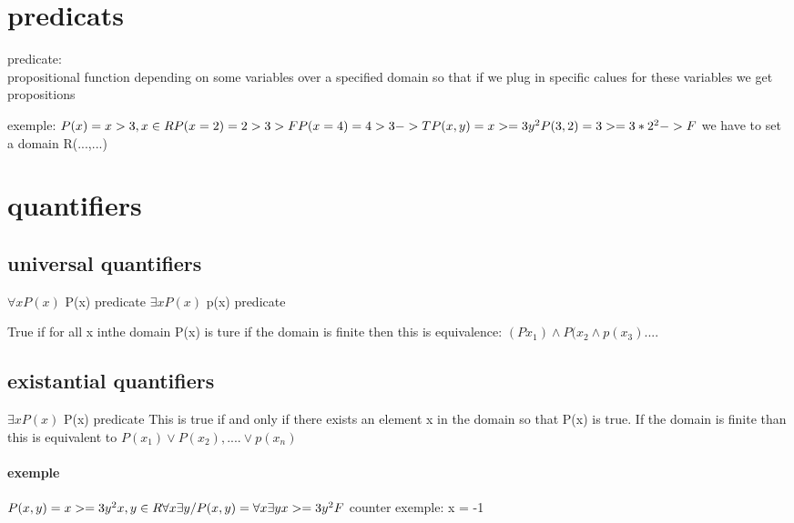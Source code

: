 \documentclass[a4paper,10pt]{article}
\begin{document}
\section{predicats}
\begin{description}
 \item predicate:\\{ propositional function depending on some variables over a specified domain so that if we plug in specific calues for these variables we get propositions}
\end{description}
exemple:
\begin{math}
 P(x)=x>3, x \in R
 \newline
 P(x=2)= 2>3\->F
 \newline
 P(x=4)=4>3->T
 \newline
 P(x,y)=x>=3y^2
 \newline
 P(3,2)=3>=3*2^2->F
\end{math}
 we have to set a domain R(...,...)
\section{quantifiers}
\subsection{universal quantifiers}
$\forall xP(x)$ P(x) predicate
\newline
$\exists xP(x)$ p(x) predicate

True if for all x inthe domain
\newline
P(x) is ture
\newline
if the domain is finite then this is equivalence: $(Px_1) \wedge P(x_2 \wedge p(x_3)....$

\subsection{existantial quantifiers}
$\exists xP(x)$ P(x) predicate
\newline
This is true if and only if there exists an element x in the domain so that P(x) is true.
\newline
If the domain is finite than this is equivalent to $ P(x_1) \vee P(x_2),.... \vee p(x_n) $
\paragraph{exemple}
\begin{math}
 P(x,y)=x>=3y^2\\ x,y\in R
 \newline
 \forall x \exists y /P(x,y)=\forall x \exists y x>=3y^2 \\ \\ F
\end{math}
counter exemple: x = -1
\end{document}
